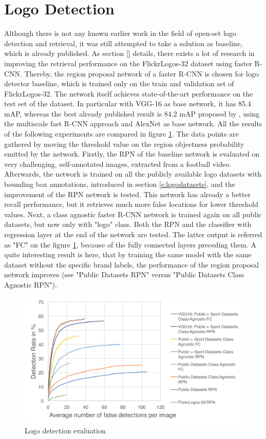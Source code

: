 \section{Logo Detection}\label{s:explogodetection}

Although there is not any known earlier work in the field of open-set logo detection and retrieval, it was still attempted to take a solution as baseline, which is already published. As section \ref{} details, there exists a lot of research in improving the retrieval performance on the FlickrLogos-32 dataset using faster R-CNN. Thereby, the region proposal network of a faster R-CNN is chosen for logo detector baseline, which is trained only on the train and validation set of FlickrLogos-32. The network itself achieves state-of-the-art performance on the test set of the dataset. In particular with VGG-16 as base network, it has 85.4 mAP, whereas the best already published result is 84.2 mAP proposed by \cite{Bao:2016:RCL:3007669.3007728}, using the multiscale fast R-CNN approach and AlexNet as base network.
\bigbreak
All the results of the following experiments are compared in figure \ref{f:detectioneval}. The data points are gathered by moving the threshold value on the region objectness probability emitted by the network.
Firstly, the RPN of the baseline network is evaluated on very challenging, self-annotated images, extracted from a football video. Afterwards, the network is trained on all the publicly available logo datasets with bounding box annotations, introduced in section \ref{s:logodatasets}, and the improvement of the RPN network is tested. This network has already a better recall performance, but it retrieves much more false locations for lower threshold values.
Next, a class agnostic faster R-CNN network is trained again on all public datasets, but now only with "logo" class. Both the RPN and the classifier with regression layer at the end of the network are tested. The latter output is referred as "FC" on the figure \ref{f:detectioneval}, because of the fully connected layers preceding them. A quite interesting result is here, that by training the same model with the same dataset without the specific brand labels, the performance of the region proposal network improves (see "Public Datasets RPN" versus "Public Datasets Class Agnostic RPN").

\begin{figure}
  \centering
  \includegraphics[width=120mm]{images/mt/logodetection.png}
  \caption{Logo detection evaluation}
  \label{f:detectioneval}
\end{figure}

